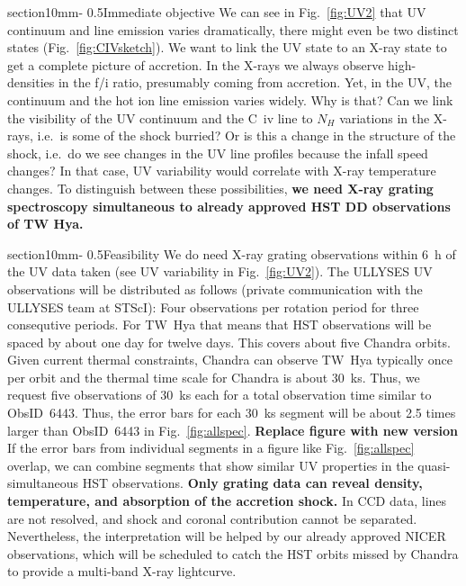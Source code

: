 \documentclass[letterpaper,11pt,twocolumn]{article}
\makeatletter
\renewcommand{\section}{\@startsection%
{section}{1}{0mm}{-\baselineskip}%
{0.5\baselineskip}{\normalfont\Large\bfseries}}%
\makeatother
\begin{document}
\section{Immediate objective}
We can see in Fig.~\ref{fig:UV2} that UV continuum and line emission varies dramatically, there might even be two distinct states (Fig.~\ref{fig:CIVsketch}). We want to link the UV state to an X-ray state to get a complete picture of accretion. In the X-rays we always observe high-densities in the f/i ratio, presumably coming from accretion. Yet, in the UV, the continuum and the hot ion line emission varies widely. Why is that? Can we link the visibility of the UV continuum and the C~{\sc iv} line to $N_H$ variations in the X-rays, i.e.\ is some of the shock burried? Or is this a change in the structure of the shock, i.e.\ do we see changes in the UV line profiles because the infall speed changes? In that case, UV variability would correlate with X-ray temperature changes.
To distinguish between these possibilities, \textbf{we need X-ray grating spectroscopy simultaneous to already approved HST DD observations of TW Hya.}






\section{Feasibility}
We do need X-ray grating observations within 6~h of the UV data taken (see UV
variability in Fig.~\ref{fig:UV2}). The ULLYSES UV observations will be
distributed as follows (private communication with the ULLYSES team at
STScI): Four observations per rotation period for three consequtive
periods. For TW~Hya that means that HST observations will be spaced by
about one day for twelve days. This covers about five Chandra
orbits. Given current thermal constraints, Chandra can observe TW~Hya
typically once per orbit and the thermal time scale for Chandra is
about 30~ks. Thus, we request five observations of 30~ks each for a
total observation time similar to ObsID~6443. Thus, the error bars for
each 30~ks segment will be about 2.5 times larger than ObsID~6443 in
Fig.~\ref{fig:allspec}. \textbf{Replace figure with new version} If
the error bars from individual segments in a figure like
Fig.~\ref{fig:allspec} overlap, we can combine segments that show
similar UV properties in the quasi-simultaneous HST observations.
\textbf{Only grating data can reveal density, temperature, and absorption of the accretion shock.} In CCD data, lines are not resolved, and shock and coronal contribution cannot be separated. Nevertheless, the interpretation will be helped by our already approved NICER observations, which will be scheduled to catch the HST orbits missed by Chandra to provide a multi-band X-ray lightcurve.
 
\end{document}

